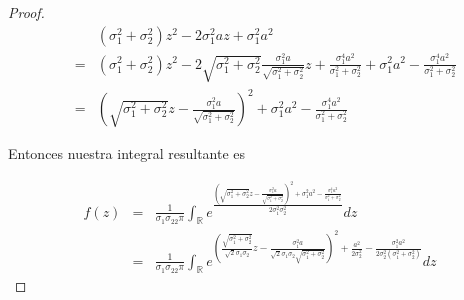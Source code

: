 \documentclass[paper=letter, fontsize=11pt]{scrartcl} %
\numberwithin{equation}{section} %
\numberwithin{figure}{section} %
\numberwithin{table}{section} %
\begin{document}
\begin{enumerate}[label = \Alph*)]
\begin{enumerate}[label = \arabic*)]
\begin{proof}

\begin{eqnarray}
&&(\sigma_1^2+\sigma_2^2)z^2-2\sigma_1^2az+\sigma_1^2a^2 \nonumber
\\&=& (\sigma_1^2+\sigma_2^2)z^2-2\sqrt{\sigma_1^2+\sigma_2^2}\frac{\sigma_1^2a}{\sqrt{\sigma_1^2+\sigma_2^2}}z  +\frac{\sigma_1^4a^2}{\sigma_1^2+\sigma_2^2}+\sigma_1^2a^2-\frac{\sigma_1^4a^2}{\sigma_1^2+\sigma_2^2}\nonumber
\\&=& (\sqrt{\sigma_1^2+\sigma_2^2}z-\frac{\sigma_1^2a}{\sqrt{\sigma_1^2+\sigma_2^2}})^2 +\sigma_1^2a^2-\frac{\sigma_1^4a^2}{\sigma_1^2+\sigma_2^2}\nonumber
\end{eqnarray}

Entonces nuestra integral resultante es

\begin{eqnarray}
f(z)&=& \frac{1}{\sigma_1\sigma_22\pi}\int_{\mathbb{R}}e^{\frac{(\sqrt{\sigma_1^2+\sigma_2^2}z-\frac{\sigma_1^2a}{\sqrt{\sigma_1^2+\sigma_2^2}})^2 +\sigma_1^2a^2-\frac{\sigma_1^4a^2}{\sigma_1^2+\sigma_2^2}}{2\sigma_1^2\sigma_2^2}} \nonumber dz
\\&=&\frac{1}{\sigma_1\sigma_22\pi}\int_{\mathbb{R}}e^{(\frac{\sqrt{\sigma_1^2+\sigma_2^2}}{\sqrt{2}\sigma_1\sigma_2}z-\frac{\sigma_1^2a}{\sqrt{2}\sigma_1\sigma_2\sqrt{\sigma_1^2+\sigma_2^2}})^2 +\frac{a^2}{2\sigma_2^2}-\frac{\sigma_1^2a^2}{2\sigma_2^2(\sigma_1^2+\sigma_2^2)}} \nonumber dz
\end{eqnarray}


\end{proof}
\end{enumerate}
\end{enumerate}
\end{document}
